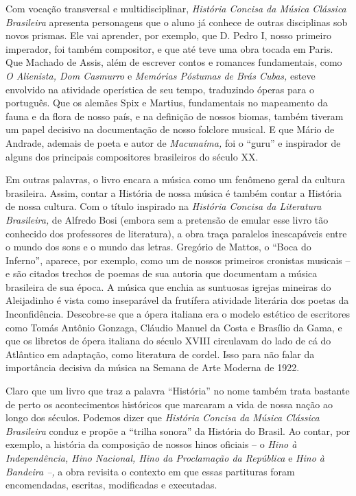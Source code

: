 \documentclass[11pt]{extarticle}
\begin{document}
Com vocação transversal e multidisciplinar, \emph{História Concisa da
Música Clássica Brasileira} apresenta personagens que o aluno já conhece
de outras disciplinas sob novos prismas. Ele vai aprender, por exemplo,
que D. Pedro I, nosso primeiro imperador, foi também compositor, e que
até teve uma obra tocada em Paris. Que Machado de Assis, além de
escrever contos e romances fundamentais, como \emph{O Alienista, Dom
Casmurro} e \emph{Memórias Póstumas de Brás Cubas,} esteve envolvido na
atividade operística de seu tempo, traduzindo óperas para o português.
Que os alemães Spix e Martius, fundamentais no mapeamento da fauna e da
flora de nosso país, e na definição de nossos biomas, também tiveram um
papel decisivo na documentação de nosso folclore musical. E que Mário de
Andrade, ademais de poeta e autor de \emph{Macunaíma,} foi o ``guru'' e
inspirador de alguns dos principais compositores brasileiros do século
XX.

Em outras palavras, o livro encara a música como um fenômeno geral da
cultura brasileira. Assim, contar a História de nossa música é também
contar a História de nossa cultura. Com o título inspirado na
\emph{História Concisa da Literatura Brasileira,} de Alfredo Bosi
(embora sem a pretensão de emular esse livro tão conhecido dos
professores de literatura), a obra traça paralelos inescapáveis entre o
mundo dos sons e o mundo das letras. Gregório de Mattos, o ``Boca do
Inferno'', aparece, por exemplo, como um de nossos primeiros cronistas
musicais -- e são citados trechos de poemas de sua autoria que
documentam a música brasileira de sua época. A música que enchia as
suntuosas igrejas mineiras do Aleijadinho é vista como inseparável da
frutífera atividade literária dos poetas da Inconfidência. Descobre-se
que a ópera italiana era o modelo estético de escritores como Tomás
Antônio Gonzaga, Cláudio Manuel da Costa e Brasílio da Gama, e que os
libretos de ópera italiana do século XVIII circulavam do lado de cá do
Atlântico em adaptação, como literatura de cordel. Isso para não falar
da importância decisiva da música na Semana de Arte Moderna de 1922.

Claro que um livro que traz a palavra ``História'' no nome também trata
bastante de perto os acontecimentos históricos que marcaram a vida de
nossa nação ao longo dos séculos. Podemos dizer que \emph{História
Concisa da Música Clássica Brasileira} conduz e propõe a ``trilha
sonora'' da História do Brasil. Ao contar, por exemplo, a história da
composição de nossos hinos oficiais -- o \emph{Hino à Independência,
Hino Nacional, Hino da Proclamação da República} e \emph{Hino à Bandeira
--,} a obra revisita o contexto em que essas partituras foram
encomendadas, escritas, modificadas e executadas.
\end{document}
